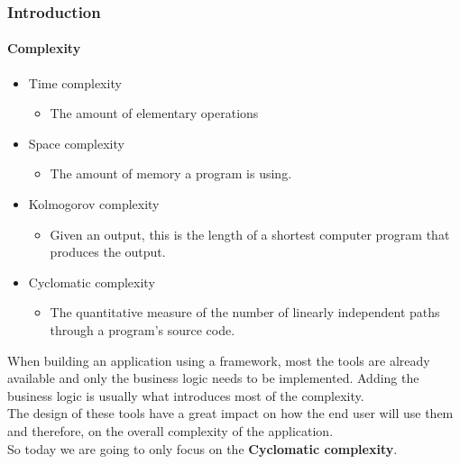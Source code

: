 \begin{frame}
    \frametitle{Introduction}
    \framesubtitle{Complexity}

    \begin{itemize}[<+->]
        \item Time complexity
        \begin{itemize}
            \item The amount of elementary operations
        \end{itemize}
        \item Space complexity
        \begin{itemize}
            \item The amount of memory a program is using.
        \end{itemize}
        \item Kolmogorov complexity
        \begin{itemize}
            \item Given an output, this is the length of a shortest computer
            program that produces the output.
        \end{itemize}
        \item Cyclomatic complexity
        \begin{itemize}
            \item The quantitative measure of the number of linearly
            independent paths through a program's source code.
        \end{itemize}
    \end{itemize}
\end{frame}

\begin{frame}
When building an application using a framework, most the tools are already
available and only the business logic needs to be implemented. Adding the
business logic is usually what introduces most of the complexity.
\\
\pause
\vspace{\baselineskip}
The design of these tools have a great impact on how the end user will use them
and therefore, on the overall complexity of the application.
\\
\pause
\vspace{\baselineskip}
So today we are going to only focus on the \textbf{Cyclomatic complexity}.
\end{frame}
